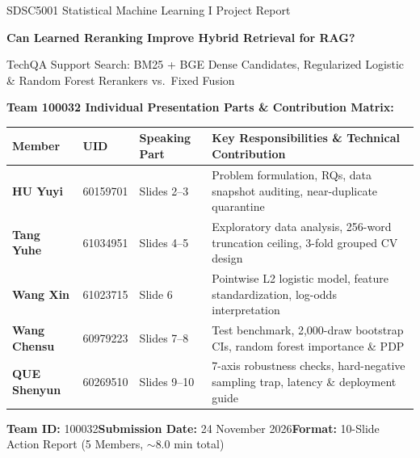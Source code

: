 \documentclass[aspectratio=169,10pt,xcolor=table]{beamer}
\begin{document}
\begin{frame}[plain]
\vspace*{-0.1cm}
{\scriptsize\color{muted}SDSC5001 \textperiodcentered{} Statistical Machine Learning I \textperiodcentered{} Project Report\par}
\vspace{0.25cm}
{\Large\bfseries\color{brand}Can Learned Reranking Improve Hybrid Retrieval for RAG?\par}
\vspace{0.12cm}
{\footnotesize\color{brand}TechQA Support Search: BM25 + BGE Dense Candidates, Regularized Logistic \& Random Forest Rerankers vs.\ Fixed Fusion\par}
\vspace{0.3cm}
{\scriptsize\textbf{\color{ink}Team 100032 \textperiodcentered{} Individual Presentation Parts \& Contribution Matrix:}\par}
\vspace{0.15cm}
{\scriptsize\begin{tabular}{@{}p{2.2cm}p{1.5cm}p{2.6cm}p{7.4cm}@{}}
\toprule
\textbf{Member} & \textbf{UID} & \textbf{Speaking Part} & \textbf{Key Responsibilities \& Technical Contribution}\\
\midrule
\textbf{HU Yuyi} & 60159701 & Slides 2--3  & Problem formulation, RQs, data snapshot auditing, near-duplicate quarantine\\
\textbf{Tang Yuhe} & 61034951 & Slides 4--5  & Exploratory data analysis, 256-word truncation ceiling, 3-fold grouped CV design\\
\textbf{Wang Xin} & 61023715 & Slide 6  & Pointwise L2 logistic model, feature standardization, log-odds interpretation\\
\textbf{Wang Chensu} & 60979223 & Slides 7--8 & Test benchmark, 2,000-draw bootstrap CIs, random forest importance \& PDP\\
\textbf{QUE Shenyun} & 60269510 & Slides 9--10 & 7-axis robustness checks, hard-negative sampling trap, latency \& deployment guide\\
\bottomrule
\end{tabular}\par}
\vspace{0.35cm}
{\tiny\color{muted}\textbf{Team ID:} 100032\qquad\textbf{Submission Date:} 24 November 2026\qquad\textbf{Format:} 10-Slide Action Report (5 Members, $\sim$8.0 min total)\par}
\end{frame}
\end{document}
